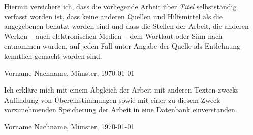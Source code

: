 \documentclass{article}
\begin{document}
Hiermit versichere ich, dass die vorliegende Arbeit über \textit{\glqq Titel\grqq} selbstständig verfasst worden ist, dass keine anderen Quellen und Hilfsmittel als die angegebenen benutzt worden sind und dass die Stellen der Arbeit, die anderen Werken – auch elektronischen Medien – dem Wortlaut oder Sinn nach entnommen wurden, auf jeden Fall unter Angabe der Quelle als Entlehnung kenntlich gemacht worden sind.

\vspace{1cm}

\noindent
\parbox{20em}{\hrulefill}

\noindent
Vorname Nachname, Münster, \today

\vspace{1cm}

\noindent
Ich erkläre mich mit einem Abgleich der Arbeit mit anderen Texten zwecks Auffindung von Übereinstimmungen sowie mit einer zu diesem Zweck vorzunehmenden Speicherung der Arbeit in eine Datenbank einverstanden.

\vspace{1cm}

\noindent
\parbox{20em}{\hrulefill}

\noindent
Vorname Nachname, Münster, \today
\end{document}
